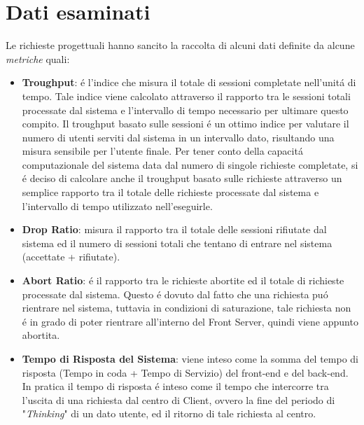 \section{Dati esaminati}
Le richieste progettuali hanno sancito la raccolta di alcuni dati definite da alcune \textit{metriche} quali:
\begin{itemize}
\item \textbf{Troughput}:
\'e l'indice  che misura il totale di sessioni completate nell'unit\'a di tempo. Tale indice viene calcolato attraverso il rapporto tra le sessioni totali processate dal sistema e l'intervallo di tempo necessario per ultimare questo compito.  Il troughput basato sulle sessioni \'e un ottimo indice per valutare il numero di utenti serviti dal sistema in un intervallo dato, risultando una misura sensibile per l'utente finale. Per tener conto della capacit\'a computazionale del sistema data dal numero di singole richieste completate, si \'e deciso di calcolare anche il troughput basato sulle richieste  attraverso un semplice rapporto tra il totale delle richieste processate dal sistema e l'intervallo di tempo utilizzato nell'eseguirle.

\item \textbf{Drop Ratio}:
misura il rapporto tra il totale delle sessioni rifiutate dal sistema ed il numero di sessioni totali che tentano di entrare nel sistema (accettate + rifiutate).

\item \textbf{Abort Ratio}:
\'e il rapporto tra le richieste abortite ed il totale di richieste processate dal sistema.
Questo \'e dovuto dal fatto che una richiesta pu\'o rientrare nel sistema, tuttavia in condizioni di saturazione, tale richiesta non \'e in grado di poter rientrare all'interno del Front Server, quindi viene appunto abortita.

\item \textbf{Tempo di Risposta del Sistema}:
viene inteso come la somma del tempo di risposta (Tempo in coda + Tempo di Servizio) del front-end e del back-end.
In pratica il tempo di risposta \'e inteso come il tempo che intercorre tra l'uscita di una richiesta dal centro di Client, ovvero la fine del periodo di "\textit{Thinking}" di un dato utente, ed il ritorno di tale richiesta al centro.



\end{itemize}
